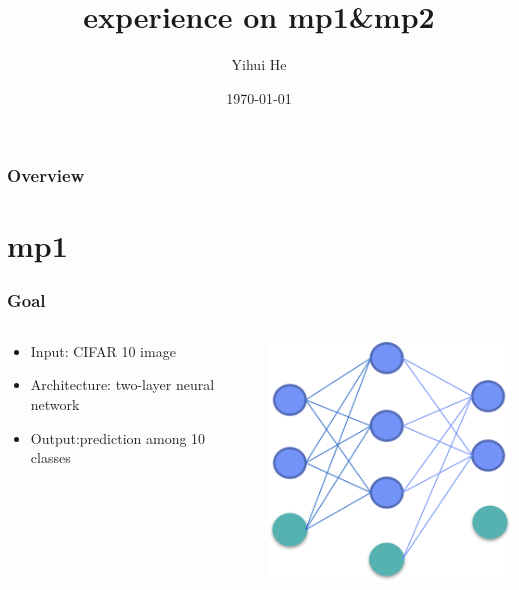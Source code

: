 \documentclass{beamer}
\title[mp1\&mp2 experience share]{experience on mp1\&mp2} %
\author{Yihui He}
\institute[ ] %
{
 I'm international  exchange student\\ 
CS 2nd year undergrad\\
 Xi'an Jiaotong University, China\\%
\medskip
\textit{yihuihe@foxmail.com}
}\date{\today}
\begin{document}
\begin{frame}
\titlepage
\end{frame}
\begin{frame}
\frametitle{Overview}
\tableofcontents
\end{frame}


\section{mp1}
\begin{frame}
\frametitle{Goal}
\begin{columns}
\begin{column}{.5\textwidth}
\begin{itemize}
\item Input: CIFAR 10 image
\item Architecture: two-layer neural network
\item Output:prediction among 10 classes
\end{itemize}
\end{column}
\begin{column}{.45\textwidth}
\includegraphics[width=\textwidth]{mp1.png}
\end{column}
\end{columns}



\end{frame}
\end{document}
